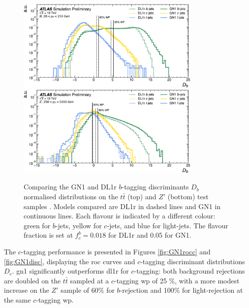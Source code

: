 \begin{figure}[h!]
  \centering
  \includegraphics[width=0.8\textwidth]{Images/FTAG/GN/GN1/eff/ttb.png}
  \includegraphics[width=0.8\textwidth]{Images/FTAG/GN/GN1/eff/zpb.png}
  \caption{Comparing the GN1 and DL1r $b$-tagging discriminants $D_b$ normalised distributions on the $t\bar{t}$ (top) and $Z'$ (bottom) test samples \cite{ATL-PHYS-PUB-2022-027}. Models compared are DL1r in dashed lines and GN1 in continuous lines. Each flavour is indicated by a different colour: green for $b$-jets, yellow for $c$-jets, and blue for light-jets. The flavour fraction is set at $f^b_c = 0.018$ for DL1r and 0.05 for GN1.}
  \label{fig:GN1disb}
\end{figure} 

The $c$-tagging performance is presented in Figures \ref{fig:GN1rocc} and \ref{fig:GN1disc}, displaying the \gls{roc} curves and $c$-tagging discriminant distributions $D_c$. \gls{gn1} significantly outperforms \gls{dl1r} for $c$-tagging: both background rejections are doubled on the $t\bar{t}$ sampled at a $c$-tagging \gls{wp} of 25 \%, with a more modest increase on the $Z'$ sample of 60\% for $b$-rejection and 100\% for light-rejection at the same $c$-tagging \gls{wp}. 

